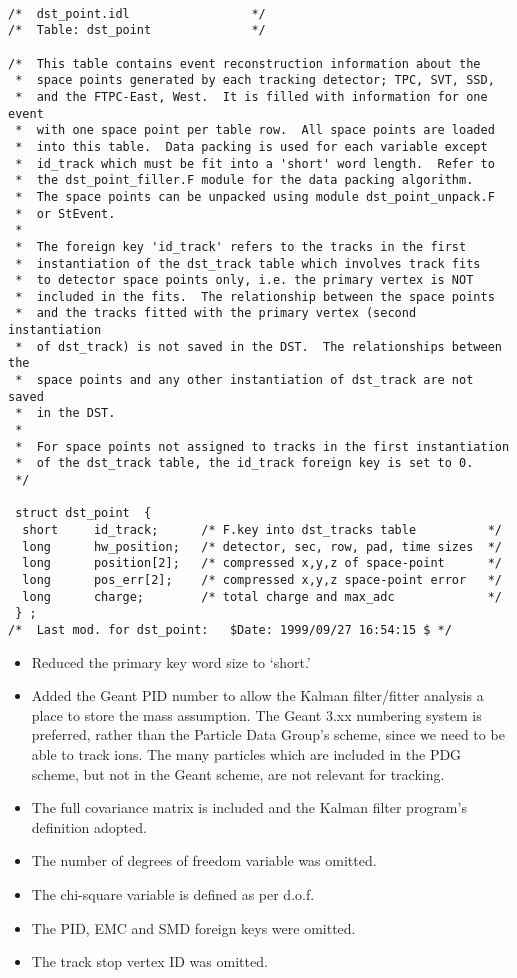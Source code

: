 \begin{verbatim}

/*  dst_point.idl                 */
/*  Table: dst_point              */

/*  This table contains event reconstruction information about the
 *  space points generated by each tracking detector; TPC, SVT, SSD,
 *  and the FTPC-East, West.  It is filled with information for one event
 *  with one space point per table row.  All space points are loaded
 *  into this table.  Data packing is used for each variable except
 *  id_track which must be fit into a 'short' word length.  Refer to
 *  the dst_point_filler.F module for the data packing algorithm.
 *  The space points can be unpacked using module dst_point_unpack.F
 *  or StEvent.
 *
 *  The foreign key 'id_track' refers to the tracks in the first
 *  instantiation of the dst_track table which involves track fits
 *  to detector space points only, i.e. the primary vertex is NOT
 *  included in the fits.  The relationship between the space points
 *  and the tracks fitted with the primary vertex (second instantiation 
 *  of dst_track) is not saved in the DST.  The relationships between the
 *  space points and any other instantiation of dst_track are not saved
 *  in the DST.
 *
 *  For space points not assigned to tracks in the first instantiation
 *  of the dst_track table, the id_track foreign key is set to 0.
 */

 struct dst_point  {
  short     id_track;      /* F.key into dst_tracks table          */
  long      hw_position;   /* detector, sec, row, pad, time sizes  */
  long      position[2];   /* compressed x,y,z of space-point      */
  long      pos_err[2];    /* compressed x,y,z space-point error   */
  long      charge;        /* total charge and max_adc             */
 } ;
/*  Last mod. for dst_point:   $Date: 1999/09/27 16:54:15 $ */

\end{verbatim}

\vspace{0.1in}
\vspace{0.05in}

\begin{itemize}
\item
Reduced the primary key word size to `short.'
\item
Added the Geant PID number to allow the Kalman filter/fitter analysis 
a place to store the mass assumption.  The Geant 3.xx numbering system
is preferred, rather than the Particle Data Group's scheme, since we 
need to be able to track ions.  The many particles which are included in the PDG
scheme, but not in the Geant scheme, are not relevant for tracking.
\item
The full covariance matrix is included and the Kalman filter program's
definition adopted.  
\item
The number of degrees of freedom variable was omitted.
\item
The chi-square variable is defined as per d.o.f.
\item
The PID, EMC and SMD foreign keys were omitted.
\item
The track stop vertex ID was omitted.
\end{itemize}

